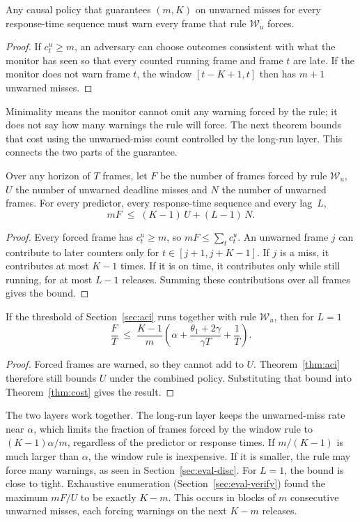 \documentclass[acmsmall,screen]{acmart}
\newcommand{\Wu}{$\mathcal{W}_u$}
\begin{document}
\begin{proposition}[Minimality]\label{prop:min}
Any causal policy that guarantees $(m,K)$ on unwarned misses for every response-time sequence must warn every frame that rule \Wu{}
forces.
\end{proposition}
\begin{proof}
If $c^u_t\ge m$, an adversary can choose outcomes consistent with what the monitor has seen so that every counted running frame and frame $t$ are late. If the monitor does not warn frame $t$, the window $[t-K+1,t]$ then has $m+1$ unwarned misses.
\end{proof}

Minimality means the monitor cannot omit any warning forced by the rule; it does not say how many warnings the rule will force. The next theorem bounds that cost using the unwarned-miss count controlled by the long-run layer. This connects the two parts of the guarantee.

\begin{theorem}\label{thm:cost}
Over any horizon of $T$ frames, let $F$ be the number of frames forced by rule \Wu, $U$ the number of unwarned deadline misses and $N$
the number of unwarned frames. For every predictor, every response-time sequence and every lag~$L$,
\[ mF \;\le\; (K-1)\,U + (L-1)\,N. \]
\end{theorem}
\begin{proof}
Every forced frame has $c^u_t\ge m$, so $mF\le\sum_t c^u_t$. An unwarned frame $j$ can contribute to later counters only for $t\in[j+1,j+K-1]$. If $j$ is a miss, it contributes at most $K-1$ times. If it is on time, it contributes only while still running, for at most $L-1$ releases. Summing these contributions over all frames gives the bound.
\end{proof}

\begin{corollary}\label{cor:cost}
If the threshold of Section~\ref{sec:aci} runs together with rule \Wu, then for $L=1$
\[ \frac FT\;\le\;\frac{K-1}{m}\left(\alpha+\frac{\theta_1+2\gamma}{\gamma T}+\frac1T\right). \]
\end{corollary}
\begin{proof}
Forced frames are warned, so they cannot add to $U$. Theorem~\ref{thm:aci} therefore still bounds $U$ under the combined policy. Substituting that bound into Theorem~\ref{thm:cost} gives the result.
\end{proof}

The two layers work together. The long-run layer keeps the unwarned-miss rate near $\alpha$, which limits the fraction of frames forced by the window rule to $(K-1)\alpha/m$, regardless of the predictor or response times. If $m/(K-1)$ is much larger than $\alpha$, the window rule is inexpensive. If it is smaller, the rule may force many warnings, as seen in Section~\ref{sec:eval-disc}. For $L=1$, the bound is close to tight. Exhaustive enumeration (Section~\ref{sec:eval-verify}) found the maximum $mF/U$ to be exactly $K-m$. This occurs in blocks of $m$ consecutive unwarned misses, each forcing warnings on the next $K-m$ releases.
\end{document}
